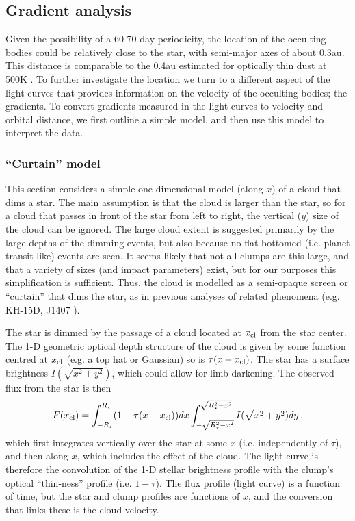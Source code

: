 \documentclass[]{rsos}
\begin{document}
\subsection{Gradient analysis}\label{ss:grad}

Given the possibility of a 60-70 day periodicity, the location of the occulting bodies
could be relatively close to the star, with semi-major axes of about 0.3au. This distance
is comparable to the 0.4au estimated for optically thin dust at 500K
\cite{2013A&A...553L...1D}. To further investigate the location we turn to a different
aspect of the light curves that provides information on the velocity of the occulting
bodies; the gradients. To convert gradients measured in the light curves to velocity and
orbital distance, we first outline a simple model, and then use this model to interpret
the data.

\subsubsection{``Curtain'' model}\label{sss:curtain}

This section considers a simple one-dimensional model (along $x$) of a cloud that dims a
star. The main assumption is that the cloud is larger than the star, so for a cloud that
passes in front of the star from left to right, the vertical ($y$) size of the cloud can
be ignored. The large cloud extent is suggested primarily by the large depths of the
dimming events, but also because no flat-bottomed (i.e. planet transit-like) events are
seen. It seems likely that not all clumps are this large, and that a variety of sizes
(and impact parameters) exist, but for our purposes this simplification is
sufficient. Thus, the cloud is modelled as a semi-opaque screen or ``curtain'' that dims
the star, as in previous analyses of related phenomena (e.g. KH-15D, J1407
\cite{2006ApJ...644..510W,2014MNRAS.441.2845V,2015ApJ...800..126K}).

The star is dimmed by the passage of a cloud located at $x_{\rm cl}$ from the star
center. The 1-D geometric optical depth structure of the cloud is given by some function
centred at $x_{\rm cl}$ (e.g. a top hat or Gaussian) so is $\tau(x-x_{\rm cl})$. The star
has a surface brightness $I(\sqrt{x^2+y^2})$, which could allow for limb-darkening. The
observed flux from the star is then
\begin{equation}\label{eq:f}
  F(x_{\rm cl}) = \int_{-R_\star}^{R_\star} (1-\tau(x-x_{\rm cl})) dx
 \int_{-\sqrt{R_\star^2-x^2}}^{\sqrt{R_\star^2-x^2}} I(\sqrt{x^2+y^2}) dy \, ,
\end{equation}
which first integrates vertically over the star at some $x$ (i.e. independently of
$\tau$), and then along $x$, which includes the effect of the cloud. The light curve is
therefore the convolution of the 1-D stellar brightness profile with the clump's optical
``thin-ness'' profile (i.e. $1-\tau$). The flux profile (light curve) is a function of
time, but the star and clump profiles are functions of $x$, and the conversion that links
these is the cloud velocity.
\end{document}
